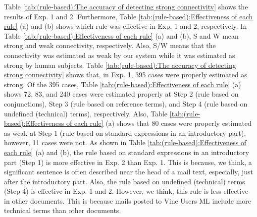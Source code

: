 \documentclass[english]{jnlp_1.4}
\begin{document}
\begin{table}[b]
 \label{tab:(rule-based):The accuracy of detecting strong connectivity}

\end{table}


Table \ref{tab:(rule-based):The accuracy of detecting strong connectivity} shows 
the results of Exp. 1 and 2.
Furthermore, 
Table \ref{tab:(rule-based):Effectiveness of each rule} (a) and (b) shows 
which rule was effective in Exp. 1 and 2, respectively.
In Table \ref{tab:(rule-based):Effectiveness of each rule} (a) and (b), 
S and W mean strong and weak connectivity, respectively.
Also, 
S/W means that the connectivity was estimated as weak by our system 
while it was estimated as strong by human subjects.
Table \ref{tab:(rule-based):The accuracy of detecting strong connectivity} shows that, 
in Exp. 1, 395 cases were properly estimated as strong.
Of the 395 cases, 
Table \ref{tab:(rule-based):Effectiveness of each rule} (a) shows  
72, 83, and 240 cases were estimated properly 
at Step 2 (rule based on conjunctions), 
Step 3 (rule based on reference terms), and 
Step 4 (rule based on undefined (technical) terms), respectively.
Also, 
Table \ref{tab:(rule-based):Effectiveness of each rule} (a) shows that 
80 cases were properly estimated as weak 
at Step 1 (rule based on standard expressions in an introductory part), 
however, 
11 cases were not.
As shown in Table \ref{tab:(rule-based):Effectiveness of each rule} (a) and (b), 
the rule based on standard expressions in an introductory part (Step 1) is 
more effective in Exp. 2 than Exp. 1.
This is because, we think,  
a significant sentence is often described near the head of a mail text, 
especially, just after the introductory part.
Also, 
the rule based on undefined (technical) terms (Step 4) is effective in Exp. 1 and 2.
However, we think,  
this rule is less effective in other documents.
This is because 
mails posted to Vine Users ML include more technical terms 
than other documents.

\begin{table}[t]
\label{tab:(rule-based):Effectiveness of each rule}

\end{table}
\end{document}
